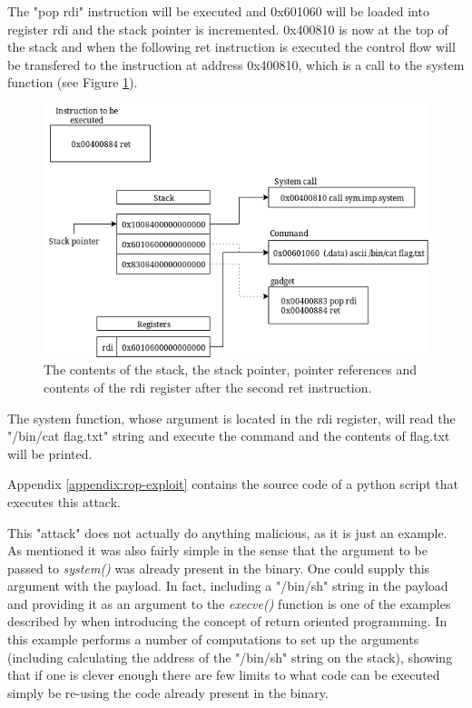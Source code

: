 The "pop rdi" instruction will be executed and 0x601060 will be loaded into register rdi
and the stack pointer is incremented. 0x400810 is now at the top of the stack and when the
following ret instruction is executed the control flow will be transfered to the
instruction at address 0x400810, which is a call to the system function (see Figure
\ref{fig:after-second}).

\begin{figure}[h]
	\centering
	\includegraphics[width=\textwidth]{background/software-diversity/figures/after-second}
	\caption{The contents of the stack, the stack pointer, pointer references and contents of the rdi register after the second ret instruction.}
	\label{fig:after-second}
\end{figure}

The system function, whose argument is located in the rdi register, will read the
"/bin/cat flag.txt" string and execute the command and the contents of flag.txt will be
printed.

Appendix \ref{appendix:rop-exploit} contains the source code of a python script that
executes this attack.

This "attack" does not actually do anything malicious, as it is just an example. As mentioned
it was also fairly simple in the sense that the argument to be passed to \textit{system()}
was already present in the binary. One could supply this argument with the payload. In
fact, including a "/bin/sh" string in the payload and providing it as an argument to the
\textit{execve()} function is one of the examples described by \textcite{rop} when
introducing the concept of return oriented programming. In this example \textcite{rop}
performs a number of computations to set up the arguments (including calculating the address
of the "/bin/sh" string on the stack), showing that if one is clever enough there are few
limits to what code can be executed simply be re-using the code already present in the binary.

